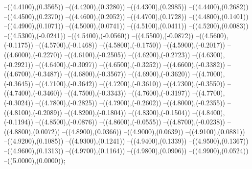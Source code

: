 {	--({\sx*(4.4100)},{\sy*(0.3565)})
	--({\sx*(4.4200)},{\sy*(0.3280)})
	--({\sx*(4.4300)},{\sy*(0.2985)})
	--({\sx*(4.4400)},{\sy*(0.2682)})
	--({\sx*(4.4500)},{\sy*(0.2370)})
	--({\sx*(4.4600)},{\sy*(0.2052)})
	--({\sx*(4.4700)},{\sy*(0.1728)})
	--({\sx*(4.4800)},{\sy*(0.1401)})
	--({\sx*(4.4900)},{\sy*(0.1071)})
	--({\sx*(4.5000)},{\sy*(0.0741)})
	--({\sx*(4.5100)},{\sy*(0.0411)})
	--({\sx*(4.5200)},{\sy*(0.0083)})
	--({\sx*(4.5300)},{\sy*(-0.0241)})
	--({\sx*(4.5400)},{\sy*(-0.0560)})
	--({\sx*(4.5500)},{\sy*(-0.0872)})
	--({\sx*(4.5600)},{\sy*(-0.1175)})
	--({\sx*(4.5700)},{\sy*(-0.1468)})
	--({\sx*(4.5800)},{\sy*(-0.1750)})
	--({\sx*(4.5900)},{\sy*(-0.2017)})
	--({\sx*(4.6000)},{\sy*(-0.2270)})
	--({\sx*(4.6100)},{\sy*(-0.2505)})
	--({\sx*(4.6200)},{\sy*(-0.2723)})
	--({\sx*(4.6300)},{\sy*(-0.2921)})
	--({\sx*(4.6400)},{\sy*(-0.3097)})
	--({\sx*(4.6500)},{\sy*(-0.3252)})
	--({\sx*(4.6600)},{\sy*(-0.3382)})
	--({\sx*(4.6700)},{\sy*(-0.3487)})
	--({\sx*(4.6800)},{\sy*(-0.3567)})
	--({\sx*(4.6900)},{\sy*(-0.3620)})
	--({\sx*(4.7000)},{\sy*(-0.3645)})
	--({\sx*(4.7100)},{\sy*(-0.3642)})
	--({\sx*(4.7200)},{\sy*(-0.3610)})
	--({\sx*(4.7300)},{\sy*(-0.3550)})
	--({\sx*(4.7400)},{\sy*(-0.3460)})
	--({\sx*(4.7500)},{\sy*(-0.3343)})
	--({\sx*(4.7600)},{\sy*(-0.3197)})
	--({\sx*(4.7700)},{\sy*(-0.3024)})
	--({\sx*(4.7800)},{\sy*(-0.2825)})
	--({\sx*(4.7900)},{\sy*(-0.2602)})
	--({\sx*(4.8000)},{\sy*(-0.2355)})
	--({\sx*(4.8100)},{\sy*(-0.2089)})
	--({\sx*(4.8200)},{\sy*(-0.1804)})
	--({\sx*(4.8300)},{\sy*(-0.1504)})
	--({\sx*(4.8400)},{\sy*(-0.1194)})
	--({\sx*(4.8500)},{\sy*(-0.0876)})
	--({\sx*(4.8600)},{\sy*(-0.0555)})
	--({\sx*(4.8700)},{\sy*(-0.0238)})
	--({\sx*(4.8800)},{\sy*(0.0072)})
	--({\sx*(4.8900)},{\sy*(0.0366)})
	--({\sx*(4.9000)},{\sy*(0.0639)})
	--({\sx*(4.9100)},{\sy*(0.0881)})
	--({\sx*(4.9200)},{\sy*(0.1085)})
	--({\sx*(4.9300)},{\sy*(0.1241)})
	--({\sx*(4.9400)},{\sy*(0.1339)})
	--({\sx*(4.9500)},{\sy*(0.1367)})
	--({\sx*(4.9600)},{\sy*(0.1313)})
	--({\sx*(4.9700)},{\sy*(0.1164)})
	--({\sx*(4.9800)},{\sy*(0.0906)})
	--({\sx*(4.9900)},{\sy*(0.0524)})
	--({\sx*(5.0000)},{\sy*(0.0000)});
}
